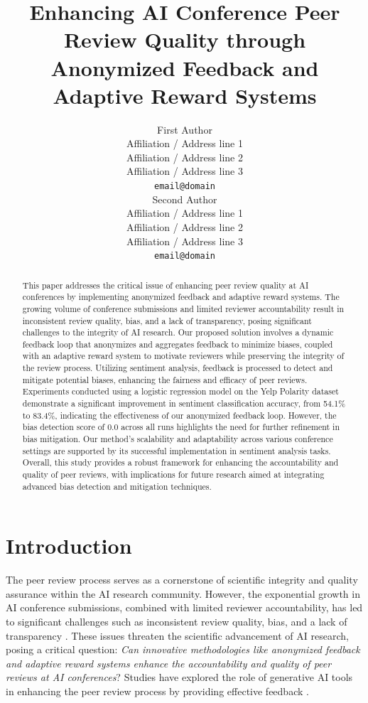 \documentclass{article} %
\title{Enhancing AI Conference Peer Review Quality through Anonymized Feedback and Adaptive Reward Systems}
\author{First Author \\
  Affiliation / Address line 1 \\
  Affiliation / Address line 2 \\
  Affiliation / Address line 3 \\
  \texttt{email@domain} \\\And
  Second Author \\
  Affiliation / Address line 1 \\
  Affiliation / Address line 2 \\
  Affiliation / Address line 3 \\
  \texttt{email@domain} \\}
\begin{document}
\maketitle
\begin{abstract}
This paper addresses the critical issue of enhancing peer review quality at AI conferences by implementing anonymized feedback and adaptive reward systems. The growing volume of conference submissions and limited reviewer accountability result in inconsistent review quality, bias, and a lack of transparency, posing significant challenges to the integrity of AI research. Our proposed solution involves a dynamic feedback loop that anonymizes and aggregates feedback to minimize biases, coupled with an adaptive reward system to motivate reviewers while preserving the integrity of the review process. Utilizing sentiment analysis, feedback is processed to detect and mitigate potential biases, enhancing the fairness and efficacy of peer reviews. Experiments conducted using a logistic regression model on the Yelp Polarity dataset demonstrate a significant improvement in sentiment classification accuracy, from 54.1\% to 83.4\%, indicating the effectiveness of our anonymized feedback loop. However, the bias detection score of 0.0 across all runs highlights the need for further refinement in bias mitigation. Our method's scalability and adaptability across various conference settings are supported by its successful implementation in sentiment analysis tasks. Overall, this study provides a robust framework for enhancing the accountability and quality of peer reviews, with implications for future research aimed at integrating advanced bias detection and mitigation techniques.
\end{abstract}


\section{Introduction}

The peer review process serves as a cornerstone of scientific integrity and quality assurance within the AI research community. However, the exponential growth in AI conference submissions, combined with limited reviewer accountability, has led to significant challenges such as inconsistent review quality, bias, and a lack of transparency \citep{sentiment2020,general2013,will2025}. These issues threaten the scientific advancement of AI research, posing a critical question: \textit{Can innovative methodologies like anonymized feedback and adaptive reward systems enhance the accountability and quality of peer reviews at AI conferences}? Studies have explored the role of generative AI tools in enhancing the peer review process by providing effective feedback \citep{generative2025,from2025}.
\end{document}
